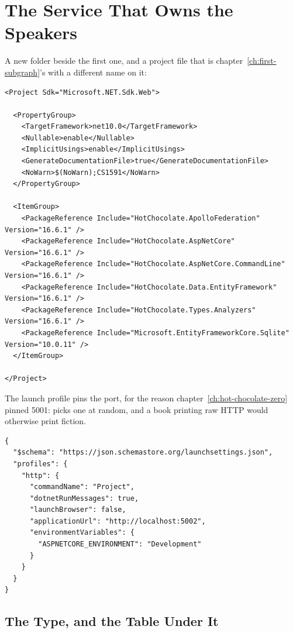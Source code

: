\section{The Service That Owns the Speakers}
\label{sec:ch09-the-service-that-owns-the-speakers}

%
A new folder beside the first one, and a project file that is
chapter~\ref{ch:first-subgraph}'s with a different name on it:

\begin{verbatim}
<Project Sdk="Microsoft.NET.Sdk.Web">

  <PropertyGroup>
    <TargetFramework>net10.0</TargetFramework>
    <Nullable>enable</Nullable>
    <ImplicitUsings>enable</ImplicitUsings>
    <GenerateDocumentationFile>true</GenerateDocumentationFile>
    <NoWarn>$(NoWarn);CS1591</NoWarn>
  </PropertyGroup>

  <ItemGroup>
    <PackageReference Include="HotChocolate.ApolloFederation" Version="16.6.1" />
    <PackageReference Include="HotChocolate.AspNetCore" Version="16.6.1" />
    <PackageReference Include="HotChocolate.AspNetCore.CommandLine" Version="16.6.1" />
    <PackageReference Include="HotChocolate.Data.EntityFramework" Version="16.6.1" />
    <PackageReference Include="HotChocolate.Types.Analyzers" Version="16.6.1" />
    <PackageReference Include="Microsoft.EntityFrameworkCore.Sqlite" Version="10.0.11" />
  </ItemGroup>

</Project>
\end{verbatim}

%
The launch profile pins the port, for the reason
chapter~\ref{ch:hot-chocolate-zero} pinned 5001:  picks
one at random, and a book printing raw HTTP would otherwise print fiction.

\begin{verbatim}
{
  "$schema": "https://json.schemastore.org/launchsettings.json",
  "profiles": {
    "http": {
      "commandName": "Project",
      "dotnetRunMessages": true,
      "launchBrowser": false,
      "applicationUrl": "http://localhost:5002",
      "environmentVariables": {
        "ASPNETCORE_ENVIRONMENT": "Development"
      }
    }
  }
}
\end{verbatim}

\subsection{The Type, and the Table Under It}

